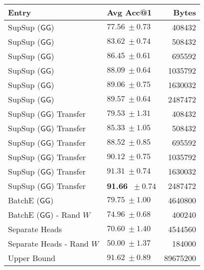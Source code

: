 \begin{tabular}{llr}
\toprule
                                          Entry &         Avg Acc@1 &    Bytes \\
\midrule
SupSup ($\ensuremath{\mathsf{GG}}$) &  $77.56~\pm 0.73$ &    408432 \\
SupSup ($\ensuremath{\mathsf{GG}}$) &  $83.62~\pm 0.74$ &    508432 \\
SupSup ($\ensuremath{\mathsf{GG}}$) &  $86.45~\pm 0.61$ &    695592 \\
SupSup ($\ensuremath{\mathsf{GG}}$) &  $88.09~\pm 0.64$ &   1035792 \\
SupSup ($\ensuremath{\mathsf{GG}}$) &  $89.06~\pm 0.75$ &   1630032 \\
SupSup ($\ensuremath{\mathsf{GG}}$) &  $89.57~\pm 0.64$ &   2487472 \\
SupSup ($\ensuremath{\mathsf{GG}}$) Transfer &  $79.53~\pm 1.31$ &    408432 \\
SupSup ($\ensuremath{\mathsf{GG}}$) Transfer &  $85.33~\pm 1.05$ &    508432 \\
SupSup ($\ensuremath{\mathsf{GG}}$) Transfer &  $88.52~\pm 0.85$ &    695592 \\
SupSup ($\ensuremath{\mathsf{GG}}$) Transfer &  $90.12~\pm 0.75$ &   1035792 \\
SupSup ($\ensuremath{\mathsf{GG}}$) Transfer &  $91.31~\pm 0.74$ &   1630032 \\
SupSup ($\ensuremath{\mathsf{GG}}$) Transfer &  \textbf{91.66} $~\pm 0.74$ &   2487472 \\
BatchE ($\ensuremath{\mathsf{GG}}$) &  $79.75~\pm 1.00$ &   4640800 \\
BatchE ($\ensuremath{\mathsf{GG}}$) - Rand $W$ &  $74.96~\pm 0.68$ &    400240 \\
Separate Heads &  $70.60~\pm 1.40$ &   4544560 \\
Separate Heads - Rand $W$ &  $50.00~\pm 1.37$ &    184000 \\\midrule
Upper Bound &  $91.62~\pm 0.89$ &  89675200 \\
\bottomrule
\end{tabular}

